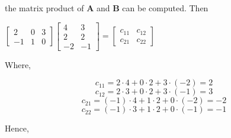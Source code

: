 \documentclass{report}
\begin{document}
the matrix product of $\mathbf{A}$ and $\mathbf{B}$ can be computed. Then
\bigbreak \noindent
\begin{center}
$\left[\begin{array}{rrr}
2 & 0 & 3 \\
-1 & 1 & 0
\end{array}\right]\left[\begin{array}{rr}
4 & 3 \\
2 & 2 \\
-2 & -1
\end{array}\right]=\left[\begin{array}{ll}
c_{11} & c_{12} \\
c_{21} & c_{22}
\end{array}\right]$
\end{center}

Where,

$$c_{11} = 2 \cdot 4 + 0 \cdot 2 + 3 \cdot (-2) = 2$$
$$
c_{12} = 2 \cdot 3+0 \cdot 2+3 \cdot(-1)=3
$$
$$
c_{21} = (-1) \cdot 4 + 1 \cdot 2 + 0 \cdot (-2) = -2
$$
$$
c_{22} = (-1) \cdot 3 + 1 \cdot 2 + 0 \cdot (-1) = -1
$$

Hence,
\end{document}
